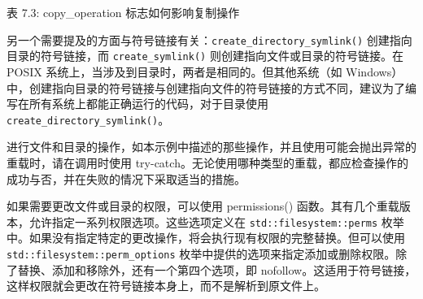 \begin{center}
表 7.3: copy\_operation 标志如何影响复制操作
\end{center}

另一个需要提及的方面与符号链接有关：\verb|create_directory_symlink()| 创建指向目录的符号链接，而 \verb|create_symlink()| 则创建指向文件或目录的符号链接。在 POSIX 系统上，当涉及到目录时，两者是相同的。但其他系统（如 Windows）中，创建指向目录的符号链接与创建指向文件的符号链接的方式不同，建议为了编写在所有系统上都能正确运行的代码，对于目录使用 \verb|create_directory_symlink()|。

\begin{myTip}
进行文件和目录的操作，如本示例中描述的那些操作，并且使用可能会抛出异常的重载时，请在调用时使用 try-catch。无论使用哪种类型的重载，都应检查操作的成功与否，并在失败的情况下采取适当的措施。
\end{myTip}

如果需要更改文件或目录的权限，可以使用 permissions() 函数。其有几个重载版本，允许指定一系列权限选项。这些选项定义在 \verb|std::filesystem::perms| 枚举中。如果没有指定特定的更改操作，将会执行现有权限的完整替换。但可以使用 \verb|std::filesystem::perm_options| 枚举中提供的选项来指定添加或删除权限。除了替换、添加和移除外，还有一个第四个选项，即 nofollow。这适用于符号链接，这样权限就会更改在符号链接本身上，而不是解析到原文件上。

